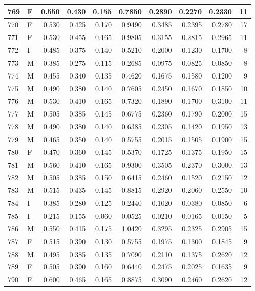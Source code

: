 \documentclass[9pt,twocolumn,twoside,]{pnas-new}
\begin{document}
\begin{tabular}{l|l|r|r|r|r|r|r|r|r}
\hline
769 & F & 0.550 & 0.430 & 0.155 & 0.7850 & 0.2890 & 0.2270 & 0.2330 & 11\\
\hline
770 & F & 0.530 & 0.425 & 0.170 & 0.9490 & 0.3485 & 0.2395 & 0.2780 & 17\\
\hline
771 & F & 0.530 & 0.455 & 0.165 & 0.9805 & 0.3155 & 0.2815 & 0.2965 & 11\\
\hline
772 & I & 0.485 & 0.375 & 0.140 & 0.5210 & 0.2000 & 0.1230 & 0.1700 & 8\\
\hline
773 & M & 0.385 & 0.275 & 0.115 & 0.2685 & 0.0975 & 0.0825 & 0.0850 & 8\\
\hline
774 & M & 0.455 & 0.340 & 0.135 & 0.4620 & 0.1675 & 0.1580 & 0.1200 & 9\\
\hline
775 & M & 0.490 & 0.380 & 0.140 & 0.7605 & 0.2450 & 0.1670 & 0.1850 & 10\\
\hline
776 & M & 0.530 & 0.410 & 0.165 & 0.7320 & 0.1890 & 0.1700 & 0.3100 & 11\\
\hline
777 & M & 0.505 & 0.385 & 0.145 & 0.6775 & 0.2360 & 0.1790 & 0.2000 & 15\\
\hline
778 & M & 0.490 & 0.380 & 0.140 & 0.6385 & 0.2305 & 0.1420 & 0.1950 & 13\\
\hline
779 & M & 0.465 & 0.350 & 0.140 & 0.5755 & 0.2015 & 0.1505 & 0.1900 & 15\\
\hline
780 & F & 0.470 & 0.360 & 0.145 & 0.5370 & 0.1725 & 0.1375 & 0.1950 & 15\\
\hline
781 & M & 0.560 & 0.410 & 0.165 & 0.9300 & 0.3505 & 0.2370 & 0.3000 & 13\\
\hline
782 & M & 0.505 & 0.385 & 0.150 & 0.6415 & 0.2460 & 0.1520 & 0.2150 & 12\\
\hline
783 & M & 0.515 & 0.435 & 0.145 & 0.8815 & 0.2920 & 0.2060 & 0.2550 & 10\\
\hline
784 & I & 0.385 & 0.280 & 0.125 & 0.2440 & 0.1020 & 0.0380 & 0.0850 & 6\\
\hline
785 & I & 0.215 & 0.155 & 0.060 & 0.0525 & 0.0210 & 0.0165 & 0.0150 & 5\\
\hline
786 & M & 0.550 & 0.415 & 0.175 & 1.0420 & 0.3295 & 0.2325 & 0.2905 & 15\\
\hline
787 & F & 0.515 & 0.390 & 0.130 & 0.5755 & 0.1975 & 0.1300 & 0.1845 & 9\\
\hline
788 & M & 0.495 & 0.385 & 0.135 & 0.7090 & 0.2110 & 0.1375 & 0.2620 & 12\\
\hline
789 & F & 0.505 & 0.390 & 0.160 & 0.6440 & 0.2475 & 0.2025 & 0.1635 & 9\\
\hline
790 & F & 0.600 & 0.465 & 0.165 & 0.8875 & 0.3090 & 0.2460 & 0.2620 & 12\\

\end{tabular}
\end{document}
